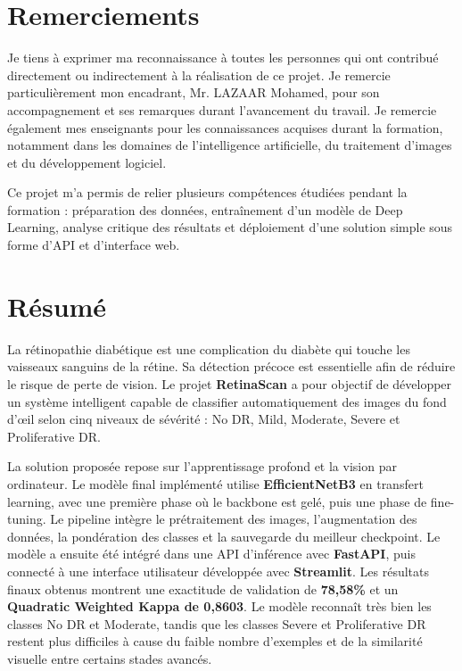 \documentclass[12pt,a4paper]{report}
\begin{document}

\chapter*{Remerciements}
Je tiens à exprimer ma reconnaissance à toutes les personnes qui ont contribué directement ou indirectement à la réalisation de ce projet. Je remercie particulièrement mon encadrant, Mr. LAZAAR Mohamed, pour son accompagnement et ses remarques durant l'avancement du travail. Je remercie également mes enseignants pour les connaissances acquises durant la formation, notamment dans les domaines de l'intelligence artificielle, du traitement d'images et du développement logiciel.

Ce projet m'a permis de relier plusieurs compétences étudiées pendant la formation : préparation des données, entraînement d'un modèle de Deep Learning, analyse critique des résultats et déploiement d'une solution simple sous forme d'API et d'interface web.

\chapter*{Résumé}
La rétinopathie diabétique est une complication du diabète qui touche les vaisseaux sanguins de la rétine. Sa détection précoce est essentielle afin de réduire le risque de perte de vision. Le projet \textbf{RetinaScan} a pour objectif de développer un système intelligent capable de classifier automatiquement des images du fond d'œil selon cinq niveaux de sévérité : No DR, Mild, Moderate, Severe et Proliferative DR.

La solution proposée repose sur l'apprentissage profond et la vision par ordinateur. Le modèle final implémenté utilise \textbf{EfficientNetB3} en transfert learning, avec une première phase où le backbone est gelé, puis une phase de fine-tuning. Le pipeline intègre le prétraitement des images, l'augmentation des données, la pondération des classes et la sauvegarde du meilleur checkpoint. Le modèle a ensuite été intégré dans une API d'inférence avec \textbf{FastAPI}, puis connecté à une interface utilisateur développée avec \textbf{Streamlit}. Les résultats finaux obtenus montrent une exactitude de validation de \textbf{78,58\%} et un \textbf{Quadratic Weighted Kappa de 0,8603}. Le modèle reconnaît très bien les classes No DR et Moderate, tandis que les classes Severe et Proliferative DR restent plus difficiles à cause du faible nombre d'exemples et de la similarité visuelle entre certains stades avancés.
\end{document}
